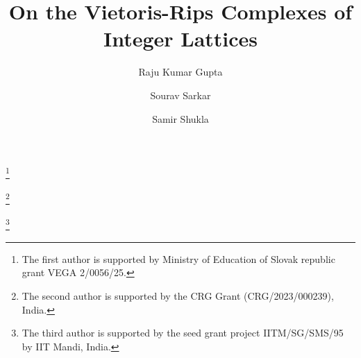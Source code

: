 \documentclass{amsart}
\theoremstyle{definition}
\theoremstyle{remark}
\numberwithin{equation}{section}
\begin{document}
\title{On the Vietoris-Rips Complexes of Integer Lattices}
\author{Raju Kumar Gupta}
\address{Institute of Mathematics, Slovak Academy of Sciences, Bratislava, Slovakia}
\thanks{The first author is supported by Ministry of Education of Slovak republic grant VEGA 2/0056/25.}

\author{Sourav Sarkar}
\address{Department of Mathematics, Indian Institute of Technology (IIT) Madras, India}
\thanks{The second author is supported by the CRG Grant (CRG/2023/000239), India.}


\author{Samir Shukla}
\address{School of Mathematical and Statistical Sciences, Indian Institute of Technology (IIT) Mandi, India}
\thanks{ The third author is supported by the seed grant project IITM/SG/SMS/95 by IIT Mandi, India.}



\end{document}
